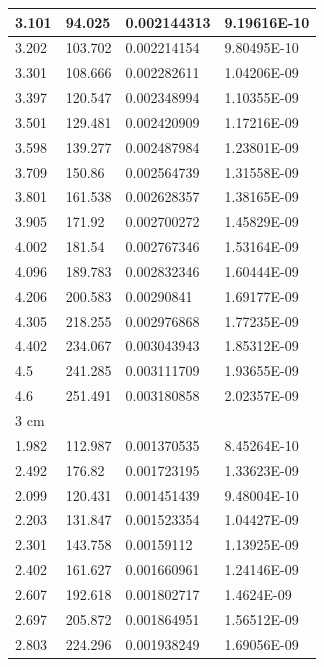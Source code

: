 \documentclass{article}
\begin{document}
\begin{longtable}{|l|l|l|l|}
        3.101 & 94.025 & 0.002144313 & 9.19616E-10 \\ \hline
        3.202 & 103.702 & 0.002214154 & 9.80495E-10 \\ \hline
        3.301 & 108.666 & 0.002282611 & 1.04206E-09 \\ \hline
        3.397 & 120.547 & 0.002348994 & 1.10355E-09 \\ \hline
        3.501 & 129.481 & 0.002420909 & 1.17216E-09 \\ \hline
        3.598 & 139.277 & 0.002487984 & 1.23801E-09 \\ \hline
        3.709 & 150.86 & 0.002564739 & 1.31558E-09 \\ \hline
        3.801 & 161.538 & 0.002628357 & 1.38165E-09 \\ \hline
        3.905 & 171.92 & 0.002700272 & 1.45829E-09 \\ \hline
        4.002 & 181.54 & 0.002767346 & 1.53164E-09 \\ \hline
        4.096 & 189.783 & 0.002832346 & 1.60444E-09 \\ \hline
        4.206 & 200.583 & 0.00290841 & 1.69177E-09 \\ \hline
        4.305 & 218.255 & 0.002976868 & 1.77235E-09 \\ \hline
        4.402 & 234.067 & 0.003043943 & 1.85312E-09 \\ \hline
        4.5 & 241.285 & 0.003111709 & 1.93655E-09 \\ \hline
        4.6 & 251.491 & 0.003180858 & 2.02357E-09 \\ \hline
        3 cm & ~ & ~ & ~ \\ \hline
        1.982 & 112.987 & 0.001370535 & 8.45264E-10 \\ \hline
        2.492 & 176.82 & 0.001723195 & 1.33623E-09 \\ \hline
        2.099 & 120.431 & 0.001451439 & 9.48004E-10 \\ \hline
        2.203 & 131.847 & 0.001523354 & 1.04427E-09 \\ \hline
        2.301 & 143.758 & 0.00159112 & 1.13925E-09 \\ \hline
        2.402 & 161.627 & 0.001660961 & 1.24146E-09 \\ \hline
        2.607 & 192.618 & 0.001802717 & 1.4624E-09 \\ \hline
        2.697 & 205.872 & 0.001864951 & 1.56512E-09 \\ \hline
        2.803 & 224.296 & 0.001938249 & 1.69056E-09 \\ \hline

\end{longtable}
\end{document}
